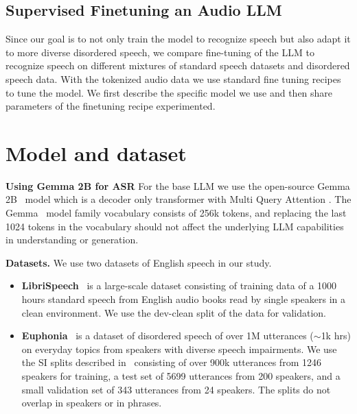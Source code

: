 \documentclass[conference]{IEEEtran}
\begin{document}
\subsection{Supervised Finetuning an Audio LLM}
%
Since our goal is to not only train the model to recognize speech but also adapt it to more diverse disordered speech, we compare fine-tuning of the LLM to recognize speech on different mixtures of standard speech datasets and disordered speech data. With the tokenized audio data we use standard fine tuning recipes to tune the model. We first describe the specific model we use and then share parameters of the finetuning recipe experimented.

\section{Model and dataset}

\textbf{Using Gemma 2B for ASR} For the base LLM we use the open-source Gemma 2B~\cite{team2024gemma} model which is a decoder only transformer \cite{vaswani2017attention} with Multi Query Attention \cite{shazeer2019fast}. %
The Gemma~\cite{team2024gemma} model family vocabulary consists of 256k tokens, and %
replacing the last 1024 tokens in the vocabulary should not affect the underlying LLM capabilities in understanding or generation.


%
%
%
%
%



\noindent\textbf{Datasets.}
We use two datasets of English speech in our study. 
\begin{itemize}[leftmargin=*]
\item[-]{\textbf{LibriSpeech}}~\cite{librispeech} is a large-scale dataset consisting of training data of a 1000 hours standard speech from English audio books read by single speakers in a clean environment. We use the dev-clean split of the data for validation.

\item[-]{\textbf{Euphonia}}~\cite{macdonald2021disordered} is a dataset of disordered speech of over 1M utterances ($\sim$1k hrs) on everyday topics from speakers with diverse speech impairments. We use the SI splits described in~\cite{green2021automatic} consisting of over 900k utterances from 1246 speakers for training, a test set of 5699 utterances from 200 speakers, and a small validation set of 343 utterances from 24 speakers. The splits do not overlap in speakers or in phrases.

\end{itemize}
\end{document}

